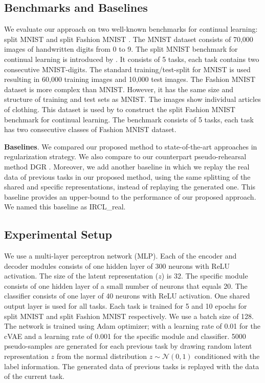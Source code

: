 \documentclass[letterpaper]{article} %
\begin{document}
\subsection{Benchmarks and Baselines}
We evaluate our approach on two well-known benchmarks for continual learning: split MNIST \cite{lecun1998mnist,zenke2017continual} and split Fashion MNIST \cite{xiao2017fashion,Farquhar2019a}. The MNIST dataset \cite{lecun1998mnist} consists of 70,000 images of handwritten digits from
0 to 9. The split MNIST benchmark for continual learning is introduced by \cite{zenke2017continual}. It consists of 5 tasks, each task contains two consecutive MNIST-digits. The standard training/test-split for MNIST is used resulting in 60,000 training images and 10,000 test images. The Fashion MNIST dataset is more complex than MNIST. However, it has the same size and structure of training and test sets as MNIST. The images show individual articles of clothing. This dataset is used by \cite{Farquhar2019a} to construct the split Fashion MNIST benchmark for continual learning. The benchmark consists of 5 tasks, each task has two consecutive classes of Fashion MNIST dataset. 

\textbf{Baselines}. We compared our proposed method to state-of-the-art approaches in regularization strategy. We also compare to our counterpart pseudo-rehearsal method DGR \cite{shin2017continual}. Moreover, we add another baseline in which we replay the real data of previous tasks in our proposed method, using the same splitting of the shared and specific representations, instead of replaying the generated one. This baseline provides an upper-bound to the performance of our proposed approach. We named this baseline as IRCL\_real.

\subsection{Experimental Setup}
We use a multi-layer perceptron network (MLP). Each of the encoder and decoder modules consists of one hidden layer of 300 neurons with ReLU activation. The size of the latent representation ($z$) is 32. The specific module consists of one hidden layer of a small number of neurons that equals 20. The classifier consists of one layer of 40 neurons with ReLU activation. One shared output layer is used for all tasks. Each task is trained for 5 and 10 epochs for split MNIST and split Fashion MNIST respectively. We use a batch size of 128.  The network is trained using Adam optimizer; with a learning rate of 0.01 for the cVAE and a learning rate of 0.001 for the specific module and classifier. 5000 pseudo-samples are generated for each previous task by drawing random latent representation $z$ from the normal distribution $z \sim \mathcal{N}(0,1)$ conditioned with the label information. The generated data of previous tasks is replayed with the data of the current task. 
\end{document}
